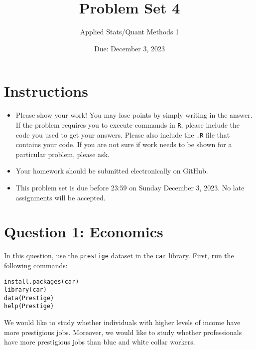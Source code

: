 \documentclass[12pt,letterpaper]{article}
\title{Problem Set 4}
\date{Due: December 3, 2023}
\author{Applied Stats/Quant Methods 1}
\begin{document}
	\maketitle
	\section*{Instructions}
	\begin{itemize}
		\item Please show your work! You may lose points by simply writing in the answer. If the problem requires you to execute commands in \texttt{R}, please include the code you used to get your answers. Please also include the \texttt{.R} file that contains your code. If you are not sure if work needs to be shown for a particular problem, please ask.
		\item Your homework should be submitted electronically on GitHub.
		\item This problem set is due before 23:59 on Sunday December 3, 2023. No late assignments will be accepted.
	\end{itemize}



	\vspace{.5cm}
\section*{Question 1: Economics}
\vspace{.25cm}
\noindent 	
In this question, use the \texttt{prestige} dataset in the \texttt{car} library. First, run the following commands:

\begin{verbatim}
install.packages(car)
library(car)
data(Prestige)
help(Prestige)
\end{verbatim} 


\noindent We would like to study whether individuals with higher levels of income have more prestigious jobs. Moreover, we would like to study whether professionals have more prestigious jobs than blue and white collar workers.
\end{document}
